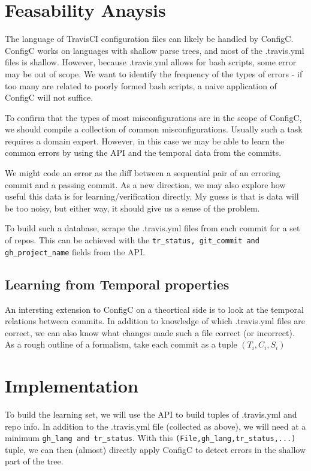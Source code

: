 \documentclass{sigplanconf}
\begin{document}
\section{Feasability Anaysis}
\label{sec:feas}

The language of TravisCI configuration files can likely be handled by ConfigC.
ConfigC works on languages with shallow parse trees, and most of the .travis.yml files is shallow.
However, because .travis.yml allows for bash scripts, some error may be out of scope.
We want to identify the frequency of the types of errors - if too many are related to poorly formed bash scripts, a naive application of ConfigC will not suffice.

To confirm that the types of most misconfigurations are in the scope of ConfigC, we should compile a collection of common misconfigurations. 
Usually such a task requires a domain expert.
However, in this case we may be able to learn the common errors by using the API and the temporal data from the commits.

We might code an error as the diff between a sequential pair of an erroring commit and a passing commit. 
As a new direction, we may also explore how useful this data is for learning/verification directly.
My guess is that is data will be too noisy, but either way, it should give us a sense of the problem.

To build such a database, scrape the .travis.yml files from each commit for a set of repos.
This can be achieved with the \verb|tr_status, git_commit and gh_project_name| fields from the API.

\subsection{Learning from Temporal properties}

An intersting extension to ConfigC on a theortical side is to look at the temporal relations between commits.
In addition to knowledge of which .travis.yml files are correct, we can also know what changes made such a file correct (or incorrect).
As a rough outline of a formalism, take each commit as a tuple $(T_i , C_i , S_i)$ 

\section{Implementation}

To build the learning set, we will use the API to build tuples of .travis.yml and repo info. 
In addition to the .travis.yml file (collected as above), we will need at a minimum \verb|gh_lang and tr_status|. 
With this \verb|(File,gh_lang,tr_status,...)| tuple, we can then (almost) directly apply ConfigC to detect errors in the shallow part of the tree.
\end{document}
